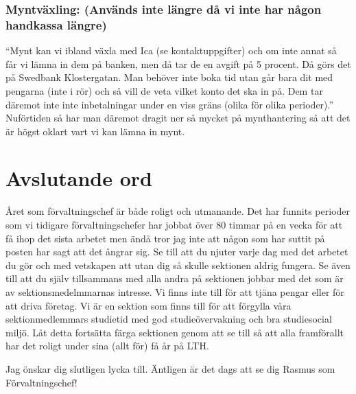 \documentclass[10pt]{article}
\begin{document}
\subsubsection{Myntväxling: (Används inte längre då vi inte har någon handkassa längre)}
“Mynt kan vi ibland växla med Ica (se kontaktuppgifter) och om inte annat så får vi lämna in dem på banken, men då tar de en avgift på 5 procent. Då görs det på Swedbank Klostergatan. Man behöver inte boka tid utan går bara dit med pengarna (inte i rör) och så vill de veta vilket konto det ska in på. Dem tar däremot inte inte inbetalningar under en viss gräns (olika för olika perioder).” Nuförtiden så har man däremot dragit ner så mycket på mynthantering så att det är högst oklart vart vi kan lämna in mynt.



\newpage
\section{Avslutande ord}
Året som förvaltningschef är både roligt och utmanande. Det har funnits perioder som vi tidigare förvaltningschefer har jobbat över 80 timmar på en vecka för att få ihop det sista arbetet men ändå tror jag inte att någon som har suttit på posten har sagt att det ångrar sig. Se till att du njuter varje dag med det arbetet du gör och med vetskapen att utan dig så skulle sektionen aldrig fungera. 
Se även till att du själv tillsammans med alla andra på sektionen jobbar med det som är av sektionsmedelmmarnas intresse. Vi finns inte till för att tjäna pengar eller för att driva företag. Vi är en sektion som finns till för att förgylla våra sektionmedlemmars studietid med god studieövervakning och bra studiesocial miljö. Låt detta fortsätta färga sektionen genom att se till så att alla framförallt har det roligt under sina (allt för) få år på LTH.

Jag önskar dig slutligen lycka till. Äntligen är det dags att se dig Rasmus som Förvaltningschef!
\end{document}
